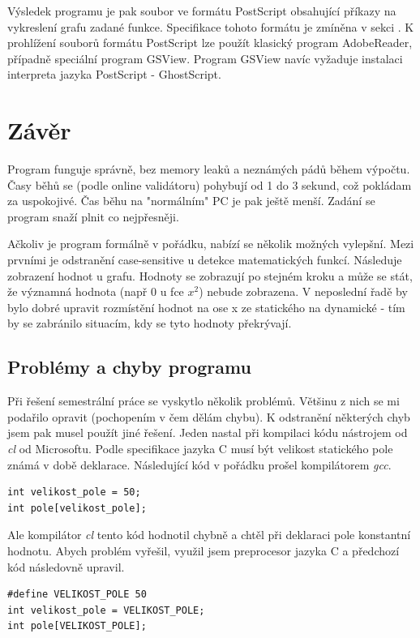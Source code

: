 \documentclass 	[a4paper,12pt]	{article}
\begin{document}
Výsledek programu je pak soubor ve formátu PostScript obsahující příkazy na vykreslení grafu zadané funkce. Specifikace tohoto formátu je zmíněna v sekci . K prohlížení souborů formátu PostScript lze použít klasický program AdobeReader, případně speciální program GSView. Program GSView navíc vyžaduje instalaci interpreta jazyka PostScript - GhostScript.

\section{Závěr}

Program funguje správně, bez memory leaků a neznámých pádů během výpočtu. Časy běhů se (podle online validátoru) pohybují od 1 do 3 sekund, což pokládam za uspokojivé. Čas běhu na "normálním"  PC je pak ještě menší. Zadání se program snaží plnit co nejpřesněji. 

Ačkoliv je program formálně v pořádku, nabízí se několik možných vylepšní. Mezi prvními je odstranění case-sensitive u detekce matematických funkcí. Následuje zobrazení hodnot u grafu. Hodnoty se zobrazují po stejném kroku a může se stát, že významná hodnota (např 0 u fce $x^2$) nebude zobrazena. V neposlední řadě by bylo dobré upravit rozmístění hodnot na ose x ze statického na dynamické - tím by se zabránilo situacím, kdy se tyto hodnoty překrývají.

\subsection{Problémy a chyby programu}
Při řešení semestrální práce se vyskytlo několik problémů. Většinu z nich se mi podařilo opravit (pochopením v čem dělám chybu). K odstranění některých chyb jsem pak musel použít jiné řešení. Jeden nastal při kompilaci kódu nástrojem od \emph{cl} od Microsoftu. Podle specifikace jazyka C musí být velikost statického pole známá v době deklarace. Následující kód v pořádku prošel kompilátorem \emph{gcc}.
\begin{verbatim}
int velikost_pole = 50;
int pole[velikost_pole];
\end{verbatim}
Ale kompilátor \emph{cl} tento kód hodnotil chybně a chtěl při deklaraci pole konstantní hodnotu. Abych problém vyřešil, využil jsem preprocesor jazyka C a předchozí kód následovně upravil.
\begin{verbatim}
#define VELIKOST_POLE 50
int velikost_pole = VELIKOST_POLE;
int pole[VELIKOST_POLE];
\end{verbatim}
\end{document}
